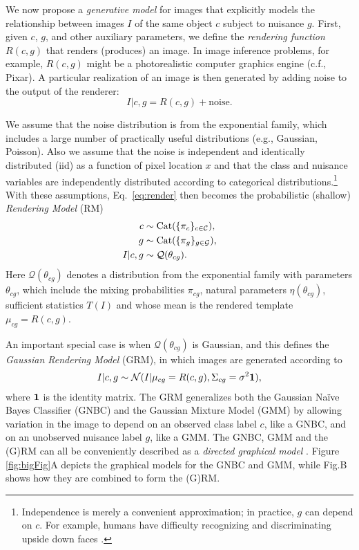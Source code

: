 \documentclass[12pt]{article}
\newcommand{\Cl}[0]{{ \mathcal{C} }}
\newcommand{\G}[0]{{ \mathcal{G} }}
\begin{document}
We now propose a {\em generative model} for images that explicitly models the relationship between images $I$ of the same object $c$ subject to nuisance $g$.
First, given $c$, $g$, and other auxiliary parameters, we define the {\em rendering function} $R(c,g)$ that renders (produces) an image.
In image inference problems, for example, $R(c,g)$ might be a photorealistic computer graphics engine (c.f., Pixar).
A particular realization of an image is then generated by adding noise to the output of the renderer:
\begin{equation}
    I |c,g = R(c,g) + \textrm{noise}. 
\label{eq:render}
\end{equation}

We assume that the noise distribution is from the exponential family, which includes a large number of practically useful distributions (e.g., Gaussian, Poisson). Also we assume that the noise is independent and identically distributed (iid) as a function of pixel location $x$ and that the class and nuisance variables are independently distributed according to categorical distributions.\footnote{Independence is merely a convenient approximation; in practice, $g$ can depend on $c$.  For example, humans have difficulty recognizing and discriminating upside down faces \cite{Searcy:1996vt}.}
With these assumptions, Eq.~\ref{eq:render} then becomes the probabilistic (shallow) {\em Rendering Model} (RM) 
\begin{align} 
	c &\sim{\rm Cat}(\{\pi_c\}_{c\in\Cl}), \quad\quad \nonumber\\
	g &\sim{\rm Cat}(\{\pi_g\}_{g\in\G}), \quad\quad \nonumber\\	
	I |c,g &\sim \mathcal{Q}(\theta_{cg}).
\label{eqn:RM}
\end{align}
Here $\mathcal{Q}(\theta_{cg})$ denotes a distribution from the exponential family with parameters $\theta_{cg}$, which include the mixing probabilities $\pi_{cg}$, natural parameters $\eta(\theta_{cg})$, sufficient statistics $T(I)$ and whose mean is the rendered template $\mu_{cg}=R(c,g)$.  

An important special case is when $\mathcal{Q}(\theta_{cg})$ is Gaussian, and this defines the {\it Gaussian Rendering Model} (GRM), in which images are generated according to
\begin{align} 
    I | c,g \sim \mathcal{N}(I | \mu_{cg}=R(c,g), \Sigma_{cg}=\sigma^2 \bf{1}),
\end{align}
where $\bf{1}$ is the identity matrix. 
The GRM generalizes both the Gaussian Na\"{i}ve Bayes Classifier (GNBC) and the Gaussian Mixture Model (GMM) by allowing variation in the image to depend on an observed class label $c$, like a GNBC, and on an unobserved nuisance label $g$, like a GMM. The GNBC, GMM and the (G)RM can all be conveniently described as a {\em directed graphical model} \cite{jordan2001graphical}. Figure \ref{fig:bigFig}A depicts the graphical models for the GNBC and GMM, while Fig.\1B shows how they are combined to form the (G)RM. 
\end{document}

